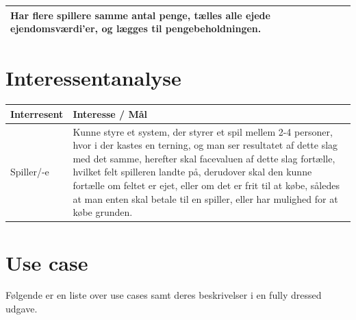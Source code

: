 \begin{tabular}{| l |p{13cm}|}
    Har flere spillere samme antal penge, tælles alle ejede ejendomsværdi’er, og lægges til pengebeholdningen. \\
    \hline
\end{tabular}

\pagebreak

\section{Interessentanalyse}

    \begin{tabular}{ | l | p{13cm} |}
    \hline
    \textbf{Interresent} & \textbf{Interesse / Mål} \\ \hline
    Spiller/-e & Kunne styre et system, der styrer et spil mellem 2-4 personer, 
    hvor i der kastes en terning, og man ser resultatet af dette slag med det samme, herefter skal facevaluen af dette slag fortælle, hvilket felt spilleren landte på, derudover skal den kunne fortælle om feltet er ejet, eller om det er frit til at købe, således at man enten skal betale til en spiller, eller har mulighed for at købe grunden.\\ \hline
    \hline
    \end{tabular}


\newpage

\section{Use case}

Følgende er en liste over use cases samt deres beskrivelser i en fully dressed udgave.


